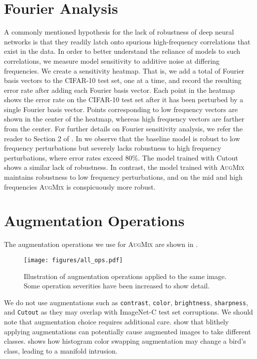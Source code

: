 \documentclass{article} \usepackage{iclr2020_conference,times}
\begin{document}
\section{Fourier Analysis}\label{app:fourier}
A commonly mentioned hypothesis \citep{gilmer2019discussion} for the lack of robustness of deep neural networks is that they readily latch onto spurious high-frequency correlations that exist in the data. In order to better understand the reliance of models to such correlations, we measure model sensitivity to additive noise at differing frequencies. We create a  sensitivity heatmap. That is, we add a total of  Fourier basis vectors to the CIFAR-10 test set, one at a time, and record the resulting error rate after adding each Fourier basis vector.
Each point in the heatmap shows the error rate on the CIFAR-10 test set after it has been perturbed by a single Fourier basis vector. Points corresponding to low frequency vectors are shown in the center of the heatmap, whereas high frequency vectors are farther from the center. For further details on Fourier sensitivity analysis, we refer the reader to Section 2 of \cite{yin2019fourier}. In  we observe that the baseline model is robust to low frequency perturbations but severely lacks robustness to high frequency perturbations, where error rates exceed 80\%. The model trained with Cutout shows a similar lack of robustness. In contrast, the model trained with \textsc{AugMix} maintains robustness to low frequency perturbations, and on the mid and high frequencies \textsc{AugMix} is conspicuously more robust.





\section{Augmentation Operations}\label{app:augops}
The augmentation operations we use for \textsc{AugMix} are shown in .

\begin{figure}[ht]
\centering
\texttt{[image: figures/all\_ops.pdf]}
\caption{
Illustration of augmentation operations applied to the same image. Some operation severities have been increased to show detail.
}\label{fig:augops}
\end{figure}

We do not use augmentations such as \texttt{contrast}, \texttt{color}, \texttt{brightness}, \texttt{sharpness}, and \texttt{Cutout} as they may overlap with ImageNet-C test set corruptions. We should note that augmentation choice requires additional care. \cite{GuoMixup} show that blithely applying augmentations can potentially cause augmented images to take different classes.  shows how histogram color swapping augmentation may change a bird's class, leading to a manifold intrusion.
\end{document}
